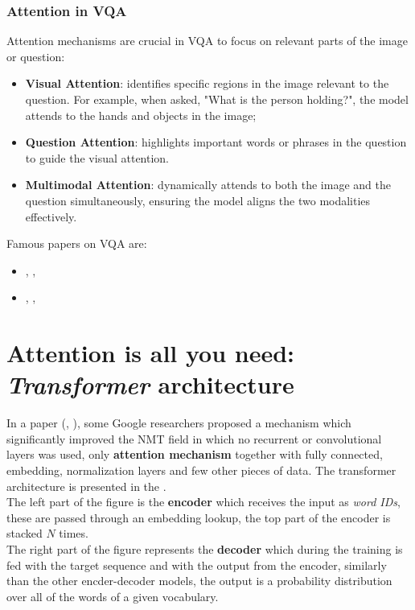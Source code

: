 \subsubsection{Attention in VQA}
Attention mechanisms are crucial in VQA to focus on relevant parts of the image or question:
\begin{itemize}
    \itemsep-0.2em
    \item \textbf{Visual Attention}: identifies specific regions in the image relevant to the question. For example, when asked, "What is the person holding?", the model attends to the hands and objects in the image; 
    \item \textbf{Question Attention}: highlights important words or phrases in the question to guide the visual attention.
    \item \textbf{Multimodal Attention}: dynamically attends to both the image and the question simultaneously, ensuring the model aligns the two modalities effectively.
\end{itemize}
\noindent
Famous papers on VQA are: 
\begin{itemize}
    \itemsep-0.2em
    \item \citeauthor{antol2015vqa} , \citeyear{vqa}, \cite{antol2015vqa} 
    \item \citeauthor{zhu2016visual7w} , , \cite{zhu2016visual7w}
\end{itemize}


\section{Attention is all you need: \textit{Transformer} architecture}
In a  paper (\cite{vaswani2017attention}, ), some Google researchers proposed a mechanism which significantly improved the NMT field in which no recurrent or convolutional layers was used, only \textbf{attention mechanism} together with fully connected, embedding, normalization layers and few other pieces of data. The transformer architecture is presented in the . \\
The left part of the figure is the \textbf{encoder} which receives the input as \textit{word IDs}, these are passed through an embedding lookup, the top part of the encoder is stacked $N$ times.\\

\noindent
The right part of the figure represents the \textbf{decoder} which during the training is fed with the target sequence and with the output from the encoder, similarly than the other encder-decoder models, the output is a probability distribution over all of the words of a given vocabulary.\\

